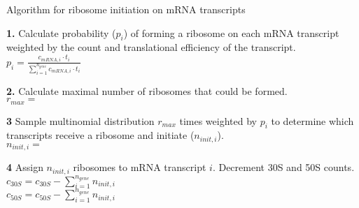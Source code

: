 \documentclass[12pt]{article}
\begin{document}
\begin{algorithm}[H]
\caption{Algorithm for ribosome initiation on mRNA transcripts}
\label{polypeptide_initiation_algorithm}


  \textbf{1.} Calculate probability ($p_i$) of forming a ribosome on each mRNA transcript weighted by the count and translational efficiency of the transcript.\\
    \-\hspace{1cm} $p_i = \frac{c_{mRNA,i} \cdot t_i}{\sum\limits^{n_{gene}}_{i=1} c_{mRNA,i} \cdot t_i}$

    \textbf{2.} Calculate maximal number of ribosomes that could be formed.\\
    \-\hspace{1cm} $r_{max} =$ 

    \textbf{3} Sample multinomial distribution $r_{max}$ times weighted by $p_i$ to determine which transcripts receive a ribosome and initiate ($n_{init,i}$).\\
    \-\hspace{1cm} $n_{init,i} =$ 

    \textbf{4} Assign $n_{init,i}$ ribosomes to mRNA transcript $i$. Decrement 30S and 50S counts.\\
    \-\hspace{1cm} $c_{30S} = c_{30S} - \sum\limits^{n_{gene}}_{i=1} n_{init,i}$\\
    \-\hspace{1cm} $c_{50S} = c_{50S} - \sum\limits^{n_{gene}}_{i=1} n_{init,i}$\\

\end{algorithm}
\newpage
\end{document}
